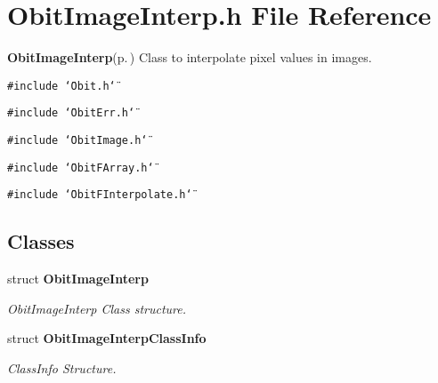 \section{Obit\-Image\-Interp.h File Reference}
\label{ObitImageInterp_8h}
{\bf Obit\-Image\-Interp}{\rm (p.\,\pageref{structObitImageInterp})} Class to interpolate pixel values in images. 

{\tt \#include \char`\"{}Obit.h\char`\"{}}\par
{\tt \#include \char`\"{}Obit\-Err.h\char`\"{}}\par
{\tt \#include \char`\"{}Obit\-Image.h\char`\"{}}\par
{\tt \#include \char`\"{}Obit\-FArray.h\char`\"{}}\par
{\tt \#include \char`\"{}Obit\-FInterpolate.h\char`\"{}}\par
\subsection*{Classes}
\begin{CompactItemize}
\item 
struct {\bf Obit\-Image\-Interp}
\begin{CompactList}\small\item\em Obit\-Image\-Interp Class structure. \item\end{CompactList}\item 
struct {\bf Obit\-Image\-Interp\-Class\-Info}
\begin{CompactList}\small\item\em Class\-Info Structure. \item\end{CompactList}\end{CompactItemize}
